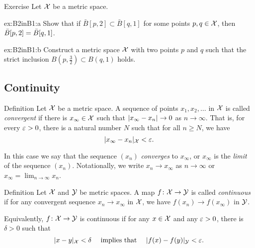 \begin{thm}{Exercise}\label{ex:B2inB1}
Let $\mathcal{X}$ be a metric space.

\begin{subthm}{ex:B2inB1:a}
Show that if $\bar B[p,2]\subset \bar B[q,1]$ for some points $p,q\in \mathcal{X}$, then $\bar B[p,2]\z=\bar B[q,1]$.
\end{subthm}

\begin{subthm}{ex:B2inB1:b} Construct a metric space $\mathcal{X}$ with two points $p$ and $q$ such that the strict inclusion
$B(p,\tfrac32)\subset B(q,1)$ holds.
\end{subthm}

\end{thm}



\subsection*{Continuity}

\begin{thm}{Definition}
 Let ${\mathcal{X}}$ be a metric space.
A sequence of points $x_1, x_2, \ldots$ in ${\mathcal{X}}$ is called \emph{convergent}
if there is 
$x_\infty\in {\mathcal{X}}$ such that $\dist{x_\infty}{x_n}{}\to 0$ as $n\to\infty$.  
That is, for every $\varepsilon > 0$, there is a natural number $N$ such that for all $n \ge N$, we have
\[
\dist{x_\infty}{x_n}{\spc{X}}
<
\eps.
\]

In this case we say that the sequence $(x_n)$ {}\emph{converges} to $x_\infty$, 
or $x_\infty$ is the {}\emph{limit} of the sequence $(x_n)$.
Notationally, we write $x_n\to x_\infty$ as $n\to\infty$
or $x_\infty=\lim_{n\to\infty} x_n$.
\end{thm}

\begin{thm}{Definition}\label{def:continuous}
Let $\mathcal{X}$ and $\mathcal{Y}$ be metric spaces.
A map $f\colon\mathcal{X}\to \mathcal{Y}$ is called \emph{continuous} if for any convergent sequence $x_n\to x_\infty$ in ${\mathcal{X}}$,
we have $f(x_n) \to f(x_\infty)$ in $\mathcal{Y}$.

Equivalently, $f\colon\mathcal{X}\to \mathcal{Y}$ is continuous if for any $x\in {\mathcal{X}}$ and any $\varepsilon>0$,
there is $\delta>0$ such that 
$$\dist{x}{y}{\spc{X}}<\delta\quad \text{ implies that }\quad \dist{f(x)}{f(y)}{\spc{Y}}<\eps.$$

\end{thm}

